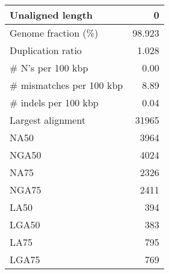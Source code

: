\documentclass[12pt,a4paper]{article}
\begin{document}
\begin{table}[ht]
\begin{center}
\begin{tabular}{|l*{1}{|r}|}
Unaligned length & 0 \\ \hline
Genome fraction (\%) & 98.923 \\ \hline
Duplication ratio & 1.028 \\ \hline
\# N's per 100 kbp & 0.00 \\ \hline
\# mismatches per 100 kbp & 8.89 \\ \hline
\# indels per 100 kbp & 0.04 \\ \hline
Largest alignment & 31965 \\ \hline
NA50 & 3964 \\ \hline
NGA50 & 4024 \\ \hline
NA75 & 2326 \\ \hline
NGA75 & 2411 \\ \hline
LA50 & 394 \\ \hline
LGA50 & 383 \\ \hline
LA75 & 795 \\ \hline
LGA75 & 769 \\ \hline
\end{tabular}
\end{center}
\end{table}
\end{document}
